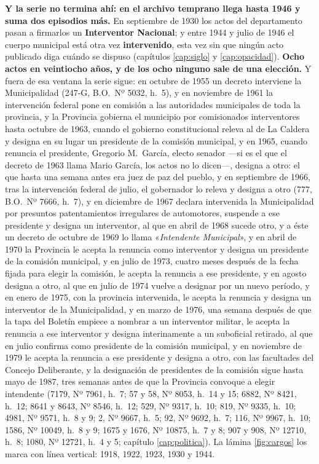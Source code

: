 \textbf{Y la serie no termina ahí: en el archivo temprano llega hasta 1946 y suma dos episodios más.} En septiembre de
1930 los actos del departamento pasan a firmarlos un \textbf{Interventor Nacional}; y entre 1944
y julio de 1946 el cuerpo municipal está otra vez \textbf{intervenido}, esta vez sin que ningún
acto publicado diga cuándo se dispuso (capítulos \ref{cap:siglo} y \ref{cap:opacidad}).
\textbf{Ocho actos en veintiocho años, y de los ocho ninguno sale de una elección.} Y fuera de esa ventana la serie sigue: en octubre de 1955 un decreto interviene la Municipalidad (247-G, B.O.\ Nº 5032, h.\ 5), y en noviembre de 1961 la intervención federal pone en comisión a las autoridades municipales de toda la provincia, y la Provincia gobierna el municipio por comisionados interventores hasta octubre de 1963, cuando el gobierno constitucional releva al de La Caldera y designa en su lugar un presidente de la comisión municipal, y en 1965, cuando renuncia el presidente, Gregorio M.\ García, electo senador ---si es el que el decreto de 1963 llama Mario García, los actos no lo dicen---, designa a otro: el que hasta una semana antes era juez de paz del pueblo, y en septiembre de 1966, tras la intervención federal de julio, el gobernador lo releva y designa a otro (777, B.O.\ Nº 7666, h.\ 7), y en diciembre de 1967 declara intervenida la Municipalidad por presuntos patentamientos irregulares de automotores, suspende a ese presidente y designa un interventor, al que en abril de 1968 sucede otro, y a éste un decreto de octubre de 1969 lo llama «\textit{Intendente Municipal}», y en abril de 1970 la Provincia le acepta la renuncia como interventor y designa un presidente de la comisión municipal, y en julio de 1973, cuatro meses después de la fecha fijada para elegir la comisión, le acepta la renuncia a ese presidente, y en agosto designa a otro, al que en julio de 1974 vuelve a designar por un nuevo período, y en enero de 1975, con la provincia intervenida, le acepta la renuncia y designa un interventor de la Municipalidad, y en marzo de 1976, una semana después de que la tapa del Boletín empiece a nombrar a un interventor militar, le acepta la renuncia a ese interventor y designa interinamente a un suboficial retirado, al que en julio confirma como presidente de la comisión municipal, y en noviembre de 1979 le acepta la renuncia a ese presidente y designa a otro, con las facultades del Concejo Deliberante, y la designación de presidentes de la comisión sigue hasta mayo de 1987, tres semanas antes de que la Provincia convoque a elegir intendente (7179, Nº 7961, h.\ 7; 57 y 58, Nº 8053, h.\ 14 y 15; 6882, Nº 8421, h.\ 12; 8641 y 8643, Nº 8546, h.\ 12; 529, Nº 9317, h.\ 10; 819, Nº 9335, h.\ 10; 4981, Nº 9571, h.\ 8 y 9; 2, Nº 9667, h.\ 5; 92, Nº 9692, h.\ 7; 116, Nº 9967, h.\ 10; 1586, Nº 10049, h.\ 8 y 9; 1675 y 1676, Nº 10875, h.\ 7 y 8; 907 y 908, Nº 12710, h.\ 8; 1080, Nº 12721, h.\ 4 y 5; capítulo \ref{cap:politica}). La lámina
\ref{fig:cargos} los marca con línea vertical: 1918, 1922, 1923, 1930 y 1944.

